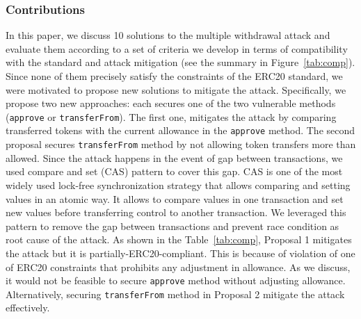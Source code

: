 \subsubsection*{Contributions} In this paper, we discuss 10 solutions to the multiple withdrawal attack and evaluate them according to a set of criteria we develop in terms of compatibility with the standard and attack mitigation (see the summary in Figure~\ref{tab:comp}). Since none of them precisely satisfy the constraints of the ERC20 standard, we were motivated to propose new solutions to mitigate the attack. Specifically, we propose  two new approaches: each secures one of the two vulnerable methods (\ie \texttt{approve} or \texttt{transferFrom}). The first one, mitigates the attack by comparing transferred tokens with the current allowance in the \texttt{approve} method. The second proposal secures \texttt{transferFrom} method by not allowing token transfers more than allowed. Since the attack happens in the event of gap between transactions, we used compare and set (CAS) pattern\cite{Ref06} to cover this gap. CAS is one of the most widely used lock-free synchronization strategy that allows comparing and setting values in an atomic way. It allows to compare values in one transaction and set new values before transferring control to another transaction. We leveraged this pattern to remove the gap between transactions and prevent race condition as root cause of the attack. As shown in the Table~\ref{tab:comp}, Proposal 1 mitigates the attack but it is partially-ERC20-compliant. This is because of violation of one of ERC20 constraints that prohibits any adjustment in allowance. As we discuss, it would not be feasible to secure \texttt{approve} method without adjusting allowance. Alternatively, securing \texttt{transferFrom} method in Proposal 2 mitigate the attack effectively.

